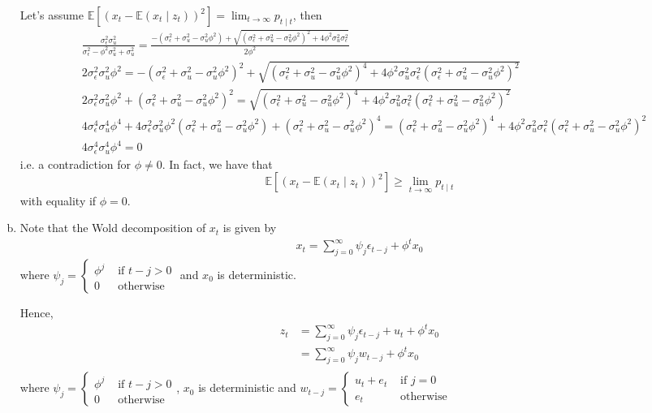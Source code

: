 \documentclass[12pt]{article}
\theoremstyle{definition}
\newcommand\E{\mathbb{E}}
\newcommand{\mat}[1]{\begin{matrix}#1\end{matrix}}
\begin{document}
\begin{enumerate}[(a)]
	Let's assume $\E[(x_t-\E(x_{t}\mid z_t))^2] = \lim_{t\to \infty} p_{t\mid t}$, then
	\begin{align*}
	&\frac{\sigma_\epsilon^2\sigma_u^2}{ \sigma_\epsilon^2-\phi^2\sigma_u^2 + \sigma_u^2}  = \frac{-( \sigma_\epsilon^2+\sigma_u^2 -\sigma_u^2\phi^2) + \sqrt{(\sigma_\epsilon^2+\sigma_u^2 -\sigma_u^2\phi^2)^2+4\phi^2\sigma_u^2\sigma_\epsilon^2}}{2\phi^2}\\
	&2\sigma_\epsilon^2\sigma_u^2 \phi^2  = -( \sigma_\epsilon^2+\sigma_u^2 -\sigma_u^2\phi^2)^2 + \sqrt{(\sigma_\epsilon^2+\sigma_u^2 -\sigma_u^2\phi^2)^4+4\phi^2\sigma_u^2\sigma_\epsilon^2( \sigma_\epsilon^2+\sigma_u^2 -\sigma_u^2\phi^2)^2}\\
	&2\sigma_\epsilon^2\sigma_u^2 \phi^2 + ( \sigma_\epsilon^2+\sigma_u^2 -\sigma_u^2\phi^2)^2   = \sqrt{(\sigma_\epsilon^2+\sigma_u^2 -\sigma_u^2\phi^2)^4+4\phi^2\sigma_u^2\sigma_\epsilon^2( \sigma_\epsilon^2+\sigma_u^2 -\sigma_u^2\phi^2)^2}\\
	&4\sigma_\epsilon^4\sigma_u^4 \phi^4 + 4\sigma_\epsilon^2\sigma_u^2 \phi^2 ( \sigma_\epsilon^2+\sigma_u^2 -\sigma_u^2\phi^2) + ( \sigma_\epsilon^2+\sigma_u^2 -\sigma_u^2\phi^2)^4  = (\sigma_\epsilon^2+\sigma_u^2 -\sigma_u^2\phi^2)^4+  4\phi^2\sigma_u^2\sigma_\epsilon^2( \sigma_\epsilon^2+\sigma_u^2 -\sigma_u^2\phi^2)^2\\
	&4\sigma_\epsilon^4\sigma_u^4 \phi^4  =0
	\end{align*}
	i.e. a contradiction for $\phi\neq 0$. In fact, we have that
	 \[
	\E[(x_t-\E(x_{t}\mid z_t))^2] \geq \lim_{t\to \infty} p_{t\mid t}
	\]
	with equality if $\phi =0$.
	\item
	
	Note that the Wold decomposition of $x_t$ is given by
	\begin{align*}
		x_t = \sum_{j=0}^{\infty} \psi_j \epsilon_{t-j} + \phi^tx_0
	\end{align*}
	where $\psi_j=\left\lbrace \mat{\phi^j & \text{ if } t-j>0 \\ 0 & \text{ otherwise}}\right.$ and $x_0$ is deterministic.
	
	Hence,
	\begin{align*}
	z_t &= \sum_{j=0}^{\infty} \psi_j \epsilon_{t-j} + u_t + \phi^tx_0 \\
	&= \sum_{j=0}^{\infty} \psi_j w_{t-j} + \phi^tx_0 \\
	\end{align*}
	where $\psi_j=\left\lbrace \mat{\phi^j & \text{ if } t-j>0 \\ 0 & \text{ otherwise}}\right.$, $x_0$ is deterministic and $w_{t-j}= \left\lbrace \mat{u_t+e_t & \text{ if } j=0 \\ e_t & \text{ otherwise}}\right.$
	
\end{enumerate}
\end{document}
